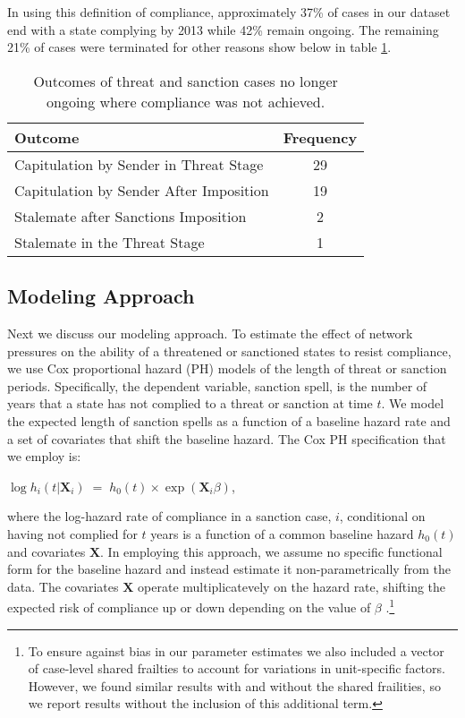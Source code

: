 In using this definition of compliance, approximately 37\% of cases in our dataset end with a state complying by 2013 while 42\% remain ongoing. The remaining 21\% of cases were terminated for other reasons show below in table \ref{tab:termCases}.

\begin{table}[ht]
	\centering
	\begin{tabular}{lc}
		\hline\hline
		Outcome & Frequency \\
		\hline
		Capitulation by Sender in Threat Stage & 29 \\
		Capitulation by Sender After Imposition & 19 \\
		Stalemate after Sanctions Imposition & 2 \\
		Stalemate in the Threat Stage & 1 \\
		\hline\hline
	\end{tabular}
	\caption{Outcomes of threat and sanction cases no longer ongoing where compliance was not achieved.}
	\label{tab:termCases}	
\end{table}
\FloatBarrier

\subsection*{Modeling Approach} 

Next we discuss our modeling approach. To estimate the effect of network pressures on the ability of a threatened or sanctioned states to resist compliance, we use Cox proportional hazard (PH) models of the length of threat or sanction periods. Specifically, the dependent variable, sanction spell, is the number of years that a state has not complied to a threat or sanction at time $t$. We model the expected length of sanction spells as a function of a baseline hazard rate and a set of covariates that shift the baseline hazard. The Cox PH specification that we employ is:

\begin{center}
	$\log h_{i}(t | \boldsymbol{X}_{i}) \; = \; h_{0}(t) \times \exp(\boldsymbol{X}_{i} \beta)$,
\end{center}

where the log-hazard rate of compliance in a sanction case, $i$, conditional on having not complied for $t$ years is a function of a common baseline hazard $h_{0}(t)$ and covariates $\boldsymbol{X}$. In employing this approach, we assume no specific functional form for the baseline hazard and instead estimate it non-parametrically from the data. The covariates $\boldsymbol{X}$ operate multiplicatevely on the hazard rate, shifting the expected risk of compliance up or down depending on the value of $\beta$ \citep{crespo2013political}.\footnote{To ensure against bias in our parameter estimates we also included a vector of case-level shared frailties to account for variations in unit-specific factors. However, we found similar results with and without the shared frailities, so we report results without the inclusion of this additional term.} 

